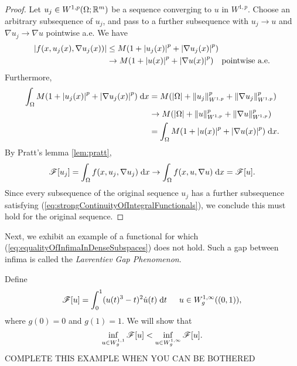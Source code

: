 \begin{proof}
    Let $u_j \in W^{1,p}(\Omega;\mathbb{R}^m)$ be a sequence converging to $u$ in $W^{1,p}$. Choose an arbitrary subsequence of $u_j$, and pass to a further subsequence with $u_j \rightarrow u$ and $\nabla u_j \rightarrow \nabla u$ pointwise a.e. We have
    \begin{equation} \begin{aligned}
        \left\lvert { f(x,u_j(x),\nabla u_j(x)) } \right\rvert &\leq M(1 + \left\lvert {u_j(x)} \right\rvert^p + \left\lvert {\nabla u_j(x)} \right\rvert^p)  \\
                                          &\rightarrow M(1 + \left\lvert {u(x)} \right\rvert^p + \left\lvert {\nabla u(x)} \right\rvert^p) \hspace{10pt} \text{pointwise a.e.}
    \end{aligned} \end{equation}
    Furthermore, 
    \begin{equation} \begin{aligned}
        \int_\Omega M(1 + \left\lvert {u_j(x)} \right\rvert^p + \left\lvert {\nabla u_j(x)} \right\rvert^p) \; \mathrm{d} x &= M(\left\lvert {\Omega} \right\rvert + \left\lVert {u_j} \right\rVert_{W^{1,p}}^p + \left\lVert {\nabla u_j} \right\rVert_{W^{1,p}}^p) \\
                                                                          &\rightarrow M(\left\lvert {\Omega} \right\rvert + \left\lVert {u} \right\rVert_{W^{1,p}}^p + \left\lVert {\nabla u} \right\rVert_{W^{1,p}}^p) \\
                                                                          &= \int_\Omega M(1 + \left\lvert {u(x)} \right\rvert^p + \left\lvert {\nabla u(x)} \right\rvert^p) \; \mathrm{d} x.
    \end{aligned} \end{equation}
    By Pratt's lemma \ref{lem:pratt},
    \begin{equation} \label{eq:strongContinuityOfIntegralFunctionals}
        \mathscr{F}[u_j] = \int_\Omega f(x,u_j,\nabla u_j) \; \mathrm{d} x \rightarrow \int_\Omega f(x,u,\nabla u) \; \mathrm{d} x = \mathscr{F}[u].
    \end{equation}
    Since every subsequence of the original sequence $u_j$ has a further subsequence satisfying (\ref{eq:strongContinuityOfIntegralFunctionals}), we conclude this must hold for the original sequence.
\end{proof}
Next, we exhibit an example of a functional for which (\ref{eq:equalityOfInfimaInDenseSubspaces}) does not hold. Such a gap between infima is called the \textit{Lavrentiev Gap Phenomenon}.
\begin{example}[Mani\`a]
    Define 
    \begin{equation}
        \mathscr{F}[u] = \int_0^1 (u(t)^3 - t)^2 \dot{u}(t) \; \mathrm{d} t \hspace{15pt} u \in W_g^{1,\infty}((0,1)),
    \end{equation}
    where $g(0) = 0$ and $g(1) = 1$. We will show that 
    \begin{equation}
        \inf_{u \in W^{1,1}_g} \mathscr{F}[u] < \inf_{u \in W^{1,\infty}_g} \mathscr{F}[u].
    \end{equation}
    {\color{red} COMPLETE THIS EXAMPLE WHEN YOU CAN BE BOTHERED}
\end{example}
